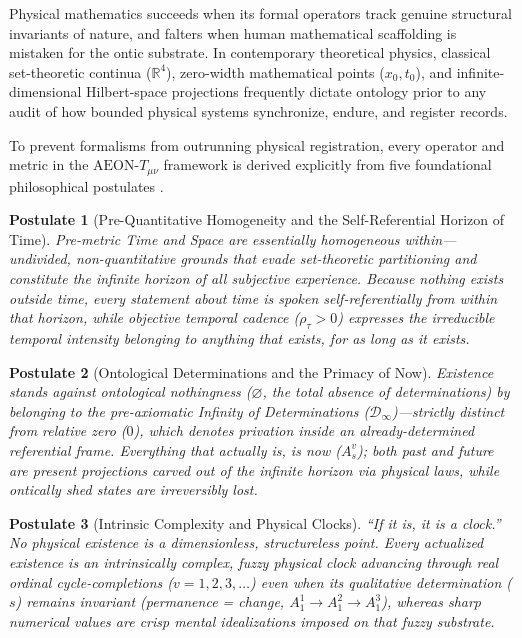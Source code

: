 \documentclass[11pt,a4paper]{article}
\newtheorem{postulate}{Postulate}
\begin{document}
Physical mathematics succeeds when its formal operators track genuine structural invariants of nature, and falters when human mathematical scaffolding is mistaken for the ontic substrate. In contemporary theoretical physics, classical set-theoretic continua ($\mathbb{R}^4$), zero-width mathematical points ($x_0, t_0$), and infinite-dimensional Hilbert-space projections frequently dictate ontology prior to any audit of how bounded physical systems synchronize, endure, and register records.

To prevent formalisms from outrunning physical registration, every operator and metric in the $\text{AEON-}T_{\mu\nu}$ framework is derived explicitly from five foundational philosophical postulates \cite{Damasio2026a, Damasio2026b, Damasio2026c}.

\begin{postulate}[Pre-Quantitative Homogeneity and the Self-Referential Horizon of Time]
Pre-metric Time and Space are \emph{essentially homogeneous within}---undivided, non-quantitative grounds that evade set-theoretic partitioning and constitute the infinite horizon of all subjective experience. Because nothing exists outside time, every statement about time is spoken self-referentially from within that horizon, while \emph{objective temporal cadence} ($\rho_\tau > 0$) expresses the irreducible temporal intensity belonging to anything that exists, for as long as it exists.
\end{postulate}

\begin{postulate}[Ontological Determinations and the Primacy of Now]
Existence stands against \emph{ontological nothingness} ($\varnothing$, the total absence of determinations) by belonging to the pre-axiomatic \emph{Infinity of Determinations} ($\mathcal{D}_\infty$)---strictly distinct from relative zero ($0$), which denotes privation inside an already-determined referential frame. Everything that actually is, is \emph{now} ($A_s^v$); both past and future are \emph{present projections} carved out of the infinite horizon via physical laws, while ontically shed states are irreversibly lost.
\end{postulate}

\begin{postulate}[Intrinsic Complexity and Physical Clocks]
``If it is, it is a clock.'' No physical existence is a dimensionless, structureless point. Every actualized existence is an \emph{intrinsically complex, fuzzy physical clock} advancing through real ordinal cycle-completions ($v = 1, 2, 3, \dots$) even when its qualitative determination ($s$) remains invariant (\emph{permanence = change}, $A_1^1 \to A_1^2 \to A_1^3$), whereas sharp numerical values are crisp mental idealizations imposed on that fuzzy substrate.
\end{postulate}
\end{document}
